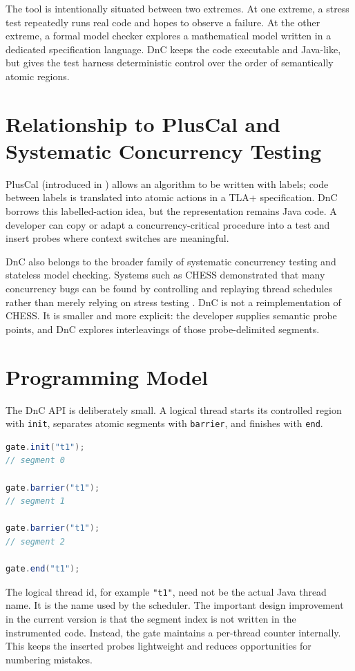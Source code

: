 \documentclass[11pt]{article}
\begin{document}
The tool is intentionally situated between two extremes. At one extreme, a stress test repeatedly runs real code and hopes to observe a failure. At the other extreme, a formal model checker explores a mathematical model written in a dedicated specification language. DnC keeps the code executable and Java-like, but gives the test harness deterministic control over the order of semantically atomic regions.

\section{Relationship to PlusCal and Systematic Concurrency Testing}

PlusCal (introduced in \cite{lamport2009pluscal}) allows an algorithm to be written with labels; code between labels is translated into atomic actions in a TLA+ specification. DnC borrows this labelled-action idea, but the representation remains Java code. A developer can copy or adapt a concurrency-critical procedure into a test and insert probes where context switches are meaningful.

DnC also belongs to the broader family of systematic concurrency testing and stateless model checking. Systems such as CHESS demonstrated that many concurrency bugs can be found by controlling and replaying thread schedules rather than merely relying on stress testing \cite{musuvathi2008chess}. DnC is not a reimplementation of CHESS. It is smaller and more explicit: the developer supplies semantic probe points, and DnC explores interleavings of those probe-delimited segments.

\section{Programming Model}

The DnC API is deliberately small. A logical thread starts its controlled region with \texttt{init}, separates atomic segments with \texttt{barrier}, and finishes with \texttt{end}.

\begin{lstlisting}[language=Java,caption={DnC-instrumented code shape}]
gate.init("t1");
// segment 0

gate.barrier("t1");
// segment 1

gate.barrier("t1");
// segment 2

gate.end("t1");
\end{lstlisting}

The logical thread id, for example \texttt{"t1"}, need not be the actual Java thread name. It is the name used by the scheduler. The important design improvement in the current version is that the segment index is not written in the instrumented code. Instead, the gate maintains a per-thread counter internally. This keeps the inserted probes lightweight and reduces opportunities for numbering mistakes.
\end{document}
